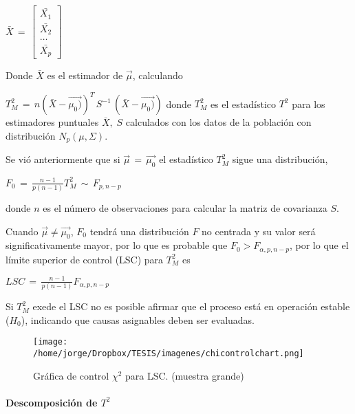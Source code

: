 \documentclass[english]{report}
\begin{document}
\vspace{10pt}

$\bar{X}\,=\,
\begin{bmatrix}
\bar{X_1}\\
\bar{X_2}\\
\hdots\\
\bar{X_p}
\end{bmatrix}$

\vspace{10pt}

Donde $\bar{X}$ es el estimador de $\vec{\mu}$, calculando

\vspace{5pt}

$T_M^2\,=\,n(\bar{X}-\vec{\mu_0)})^T\,S^{-1}\,(\bar{X}-\vec{\mu_0)})$ donde $T_M^2$ es el estadístico $T^2$ para los estimadores puntuales $\bar{X},\;S$ calculados con los datos de la población con distribución $N_p(\mu,\Sigma)$.

Se vió anteriormente que si $\vec{\mu}\,=\,\vec{\mu_0}$	el estadístico $T_M^2$  sigue una distribución,

$F_0\,=\,\frac{n-1}{p(n-1)}T_M^2\,\sim\,F_{p,n-p}$

donde $n$ es el número de observaciones para calcular la matriz de covarianza $S$.

Cuando $\vec{\mu}\neq\vec{\mu_0}$, $F_0$ tendrá una distribución $F$ no centrada y su valor será significativamente mayor, por lo que es probable que $F_0 > F_{\alpha,p,n-p}$, por lo que el límite superior de control (LSC) para $T_M^2$ es


$LSC\,=\,\frac{n-1}{p(n-1)}F_{\alpha,p,n-p}$

Si $T_M^2$ exede el LSC no es posible afirmar que el proceso está en operación estable ($H_0$), indicando que causas asignables deben ser evaluadas.

\begin{figure}[H]
\centering
\texttt{[image: /home/jorge/Dropbox/TESIS/imagenes/chicontrolchart.png]}
\caption{Gráfica de control $\chi^2$ para LSC. (muestra grande) }
\label{c2f7}
\end{figure}


\paragraph{Descomposición de $T^2$}
 
\end{document}
